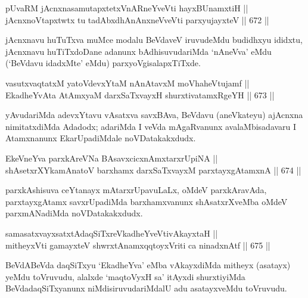 
\begin{shl}
pUvaRM jAcnxnasamutapxtetxVnARneYveVti hayxBUnamxtiH || \\
jAcnxnoVtapxtwtx tu tadAbxdhAnAnxneVveVti parxyujayxteV \hfill || 672 ||  
\end{shl}

\begin{artha} 
jAcnxnavu huTuTxva muMce modalu BeVdaveV iruvudeMdu budidhxyu ididxtu, 
jAcnxnavu huTiTxdoDane adanunx bAdhisuvudariMda `nAneVva' eMdu 
(`BeVdavu idadxMte' eMdu) parxyoVgisalapxTiTxde.
\end{artha}


\begin{shl}
vasutxvaqtatxM yatoV\s devxYtaM nAnAtavxM moVhaheVtujamf || \\
EkadheYvAta AtAmx\s yaM darxSaTxvayxH shurxtivatamxRgeYH \hfill || 673 ||  
\end{shl}

\begin{artha} 
yAvudariMda adevxYtavu vAsatxva savxBAva, BeVdavu (aneVkateyu) 
ajAcnxna nimitatxdiMda Adadodx; adariMda I veVda mAgaRvanunx 
avalaMbisadavaru I Atamxnanunx EkarUpadiMdale noVDatakakxdudx.
\end{artha}

\begin{shl}
EkeVneYva parxkAreVNa BAsavxcicxnAmxtarxrUpiNA || \\
shAsetxrXYkamAnatoV barxhamx darxSaTxvayxM parxtayxgAtamxnA \hfill || 674 ||  
\end{shl}

\begin{artha} 
parxkAshisuva ceYtanayx mAtarxrUpavuLaLx, oMdeV parxkAravAda, 
parxtayxgAtamx savxrUpadiMda barxhamxvanunx shAsatxrXveMba oMdeV 
parxmANadiMda noVDatakakxdudx.
\end{artha}


\begin{shl}
samasatxvayxsatxtAdaqSiTxreVkadheYveVtivAkayxtaH || \\
mitheyxVti gamayxteV shwrxtAnamxqqtoyxVriti ca ninadxnAtf \hfill || 675 ||  
\end{shl}

\begin{artha} 
BeVdABeVda daqSiTxyu `EkadheYva' eMba vAkayxdiMda mitheyx (asatayx) 
yeMdu toVruvudu, alalxde `maqtoVyxH sa' itAyxdi shurxtiyiMda 
BeVdadaqSiTxyanunx niMdisiruvudariMdalU adu asatayxveMdu toVruvudu.
\end{artha}


